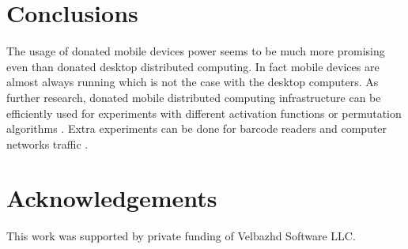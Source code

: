 \documentclass{llncs}
\begin{document}
\section{Conclusions}

The usage of donated mobile devices power seems to be much more promising even than donated desktop distributed computing. In fact mobile devices are almost always running which is not the case with the desktop computers. As further research, donated mobile distributed computing infrastructure can be efficiently used for experiments with different activation functions \cite{zankinski01} or permutation algorithms \cite{zankinski02}. Extra experiments can be done for barcode readers \cite{atanasova02} and computer networks traffic \cite{tashev01,tashev02}.


\section*{Acknowledgements}

This work was supported by private funding of Velbazhd Software LLC.

\end{document}
